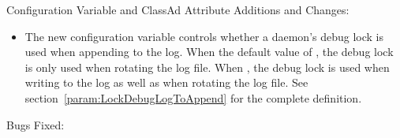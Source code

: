 \noindent Configuration Variable and ClassAd Attribute Additions and Changes:

\begin{itemize}

\item The new configuration variable 
controls whether a daemon's debug lock is used when appending to the log.
When the default value of ,
the debug lock is only used when rotating the log file.
When , the debug lock is used when writing to
the log as well as when rotating the log file.
See section~\ref{param:LockDebugLogToAppend} for the complete definition.

\end{itemize}

\noindent Bugs Fixed:

